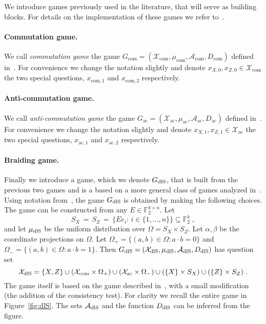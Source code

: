 \documentclass[11pt]{article}
\theoremstyle{definition}
\newcommand{\field}{\mathbb{F}_2}
\newcommand{\dlS}{\ensuremath{\rm dlS}}
\newcommand{\F}{\ensuremath{\mathbb{F}}}
\newcommand{\mA}{\ensuremath{\mathcal{A}}}
\newcommand{\mX}{\ensuremath{\mathcal{X}}}
\newcommand{\cc}{\mathrm{com}}
\newcommand{\ac}{\mathrm{ac}}
\begin{document}
We introduce games previously used in the literature, that will serve as building blocks. For details on the implementation of these games we refer to~\cite{de2022spectral}.

\paragraph{Commutation game.}
We call \emph{commutation game} the game $G_{\cc}=(\mX_\cc,\mu_\cc,\mA_\cc,D_\cc)$ defined in~\cite[Section 3.1]{de2022spectral}. For convenience we change the notation slightly and denote $x_{X,0}, x_{Z,0} \in \mX_{\cc}$ the two special questions, $x_{\cc,1}$ and $x_{\cc,2}$ respectively. 

\paragraph{Anti-commutation game.}
We call \emph{anti-commutation game} the game $G_\ac=(\mX_\ac,\mu_\ac,\mA_\ac,D_\ac)$ defined in~\cite[Section 3.2]{de2022spectral}. For convenience we change the notation slightly and  denote $x_{X,1}, x_{Z,1} \in \mX_{\ac}$ the two special questions, $x_{\ac,1}$ and $x_{\ac,2}$ respectively. 

\paragraph{Braiding game.}
Finally we introduce a game, which we denote $G_{\dlS}$, that is built from the previous two games and is a based on a more general class of games analyzed in~\cite[Section 3.4]{de2022spectral}.  Using notation from~\cite{de2022spectral}, the game $G_{\dlS}$ is obtained by making the following choices. The game can be constructed from any $E\in\F_2^{k\times n}$. Let 
\begin{equation}\label{eq:dls-sets}
 S_X\,=\,S_Z\,=\,\{E e_i:\,i\in\{1,\ldots,n\}\}\subseteq \field^k\;,
\end{equation}
and let $\mu_{\dlS}$ be the uniform distribution over $\Omega=S_X\times S_Z$. Let $\alpha,\beta$ be the coordinate projections on $\Omega$. Let $\Omega_+ = \{(a,b)\in \Omega:a\cdot b=0\}$ and $\Omega_-=\{(a,b)\in\Omega:a\cdot b=1\}$. Then $G_{\dlS}=(\mX_{\dlS},\mu_{\dlS},\mA_{\dlS},D_{\dlS})$ has question set 
\[ \mX_{\dlS} = \{X,Z\} \cup (\mX_{\cc}\times \Omega_+) \cup (\mX_{\ac} \times \Omega_-) \cup (\{X\}\times S_X) \cup (\{Z\}\times S_Z)\;.\]
The game itself is based on the game described in~\cite[Section 3.4]{de2022spectral}, with a small modification (the addition of the consistency test). For clarity we recall the entire game in Figure~\ref{fig:dlS}. The sets $\mA_{\dlS}$ and the function $D_{\dlS}$ can be inferred from the figure. 
\end{document}
